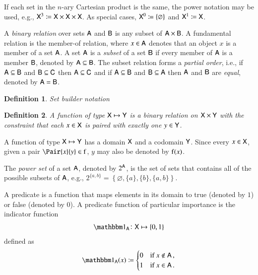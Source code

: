 \documentclass[10pt,final,hidelinks]{article}
\numberwithin{equation}{section}
\newcommand{\SetIndicator}[1]{\BlackboardSet{1}_{#1}}
\newcommand{\EmptySet}{\varnothing}
\newcommand{\PS}[1]{2^{#1}}
\newcommand{\envnumstyle}{chapter}
\renewcommand{\envnumstyle}{chapter}
\renewcommand{\envnumstyle}{section}
\theoremstyle{plain}
\newtheorem{definition}{Definition}[\envnumstyle]
\begin{document}
If each set in the $n$-ary Cartesian product is the same, the power notation may be used, e.g., $\Set{X}^3 \coloneqq \Set{X} \times \Set{X} \times \Set{X}$.
As special cases, $\Set{X}^0 \coloneqq \{ \EmptySet \}$ and $\Set{X}^1 \coloneqq \Set{X}$.

A \emph{binary relation} over sets $\Set{A}$ and $\Set{B}$ is any subset of $\Set{A} \times \Set{B}$.
A fundamental relation is the member-of relation, where $\SetContains[x][\Set{A}]$ denotes that an object $x$ is a member of a set $\Set{A}$.
A set $\Set{A}$ is a \emph{subset} of a set $\Set{B}$ if every member of $\Set{A}$ is a member $\Set{B}$, denoted by $\Set{A} \subseteq \Set{B}$.
The subset relation forms a \emph{partial order}, i.e., if $\Set{A} \subseteq \Set{B}$ and $\Set{B} \subseteq \Set{C}$ then $\Set{A} \subseteq \Set{C}$ and 
if $\Set{A} \subseteq \Set{B}$ and $\Set{B} \subseteq \Set{A}$ then $\Set{A}$ and $\Set{B}$ are \emph{equal}, denoted by $\Set{A} = \Set{B}$.


\begin{definition}
	Set builder notation
\end{definition}


\begin{definition}
	A \emph{function} of type $\Set{X} \mapsto \Set{Y}$ is a binary relation on $\Set{X} \times \Set{Y}$ with the constraint that each $x \in \Set{X}$ is paired with exactly one $y \in \Set{Y}$.
\end{definition}
A function of type $\Set{X} \mapsto \Set{Y}$ has a domain $\Set{X}$ and a codomain $\Set{Y}$.
Since every $x \in \Set{X}$, given a pair $\Pair{x}{y} \in \Fun{f}$, $y$ may also be denoted by $\Fun{f}(x)$.

The \emph{power set} of a set $\Set{A}$, denoted by $\PS{\Set{A}}$, is the set of sets that contains all of the possible subsets of $\Set{A}$, e.g., $\PS{\{a, b\}}= \left\{ \EmptySet, \{a\}, \{b\}, \{a, b\} \right\}$.

A predicate is a function that maps elements in its domain to true (denoted by $1$) or false (denoted by $0$).
A predicate function of particular importance is the indicator function
\begin{equation}
	\SetIndicator{\Set{A}} \colon \Set{X} \mapsto \{0,1\}
\end{equation}
defined as
\begin{equation}
	\SetIndicator{\Set{A}}(x) \coloneqq
	\begin{cases}
		0 & \text{if $x \notin \Set{A}$}\,,\\
		1 & \text{if $x \in \Set{A}$}\,.
	\end{cases}
\end{equation}
\end{document}
